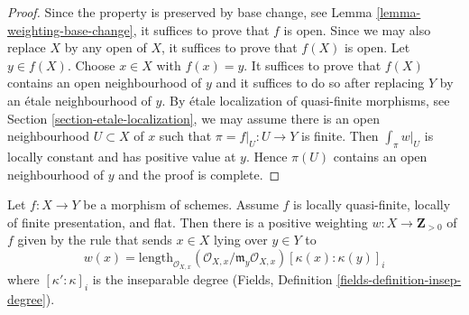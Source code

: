 \begin{proof}
Since the property is preserved by base change, see
Lemma \ref{lemma-weighting-base-change}, it suffices
to prove that $f$ is open. Since we may also replace
$X$ by any open of $X$, it suffices to prove that $f(X)$
is open. Let $y \in f(X)$. Choose $x \in X$ with $f(x) = y$.
It suffices to prove that $f(X)$ contains an open neighbourhood
of $y$ and it suffices to do so after replacing $Y$ by an
\'etale neighbourhood of $y$. By \'etale localization of
quasi-finite morphisms, see Section \ref{section-etale-localization},
we may assume
there is an open neighbourhood $U \subset X$ of $x$
such that $\pi = f|_U : U \to Y$ is finite. Then
$\int_\pi w|_U$ is locally constant and has positive value at $y$.
Hence $\pi(U)$ contains an open neighbourhood of $y$
and the proof is complete.
\end{proof}

\begin{lemma}
\label{lemma-weighting-flat-quasi-finite}
Let $f : X \to Y$ be a morphism of schemes. Assume $f$ is
locally quasi-finite, locally of finite presentation, and flat.
Then there is a positive weighting $w : X \to \mathbf{Z}_{> 0}$ of $f$
given by the rule that sends $x \in X$ lying over $y \in Y$ to
$$
w(x) =
\text{length}_{\mathcal{O}_{X, x}}
(\mathcal{O}_{X, x}/\mathfrak m_y \mathcal{O}_{X, x})
[\kappa(x) : \kappa(y)]_i
$$
where $[\kappa' : \kappa]_i$ is the inseparable degree
(Fields, Definition \ref{fields-definition-insep-degree}).
\end{lemma}

